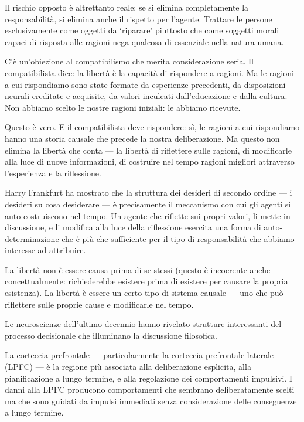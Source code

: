 \documentclass[12pt,a4paper,openany]{book}
\newcommand{\sezione}[1]{\vspace{1.2em}{\large\bfseries #1}\vspace{0.5em}\par}
\begin{document}
Il rischio opposto è altrettanto reale: se si elimina completamente la responsabilità, si elimina anche il rispetto per l'agente. Trattare le persone esclusivamente come oggetti da `riparare' piuttosto che come soggetti morali capaci di risposta alle ragioni nega qualcosa di essenziale nella natura umana.

\sezione{Il problema del regresso causale}

C'è un'obiezione al compatibilismo che merita considerazione seria. Il compatibilista dice: la libertà è la capacità di rispondere a ragioni. Ma le ragioni a cui rispondiamo sono state formate da esperienze precedenti, da disposizioni neurali ereditate e acquisite, da valori inculcati dall'educazione e dalla cultura. Non abbiamo scelto le nostre ragioni iniziali: le abbiamo ricevute.

Questo è vero. E il compatibilista deve rispondere: sì, le ragioni a cui rispondiamo hanno una storia causale che precede la nostra deliberazione. Ma questo non elimina la libertà che conta --- la libertà di riflettere sulle ragioni, di modificarle alla luce di nuove informazioni, di costruire nel tempo ragioni migliori attraverso l'esperienza e la riflessione.

Harry Frankfurt ha mostrato che la struttura dei desideri di secondo ordine --- i desideri su cosa desiderare --- è precisamente il meccanismo con cui gli agenti si auto-costruiscono nel tempo. Un agente che riflette sui propri valori, li mette in discussione, e li modifica alla luce della riflessione esercita una forma di auto-determinazione che è più che sufficiente per il tipo di responsabilità che abbiamo interesse ad attribuire.

La libertà non è essere causa prima di se stessi (questo è incoerente anche concettualmente: richiederebbe esistere prima di esistere per causare la propria esistenza). La libertà è essere un certo tipo di sistema causale --- uno che può riflettere sulle proprie cause e modificarle nel tempo.

\sezione{Neuroscienze della deliberazione}

Le neuroscienze dell'ultimo decennio hanno rivelato strutture interessanti del processo decisionale che illuminano la discussione filosofica.

La corteccia prefrontale --- particolarmente la corteccia prefrontale laterale (LPFC) --- è la regione più associata alla deliberazione esplicita, alla pianificazione a lungo termine, e alla regolazione dei comportamenti impulsivi. I danni alla LPFC producono comportamenti che sembrano deliberatamente scelti ma che sono guidati da impulsi immediati senza considerazione delle conseguenze a lungo termine.
\end{document}
